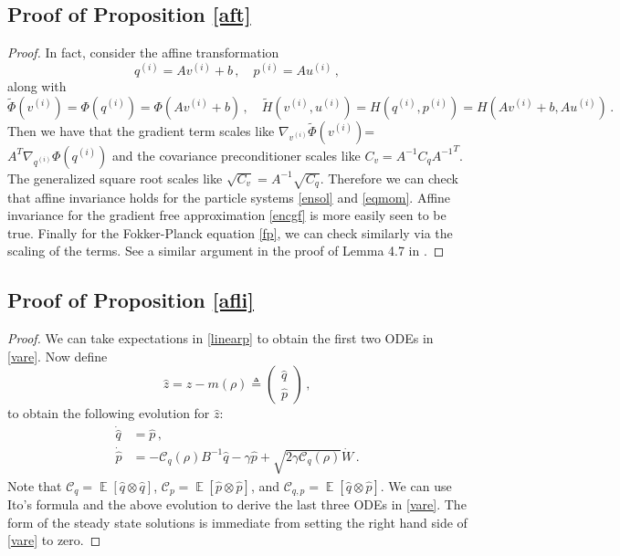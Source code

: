 \documentclass[12pt]{caltech_thesis}
\numberwithin{equation}{section}
\begin{document}
{\subsection{Proof of Proposition \ref{aft}}
\label{proofaf}
\begin{proof}
In fact, consider the affine transformation 
\[q^{(i)}=A v^{(i)}+b\,,\quad p^{(i)}=A u^{(i)}\,,\] along with  $$\tilde{\Phi}(v^{(i)})=\Phi(q^{(i)})=\Phi(Av^{(i)}+b)\,,\quad\tilde{H}(v^{(i)}, u^{(i)})=H(q^{(i)}, p^{(i)})=H(Av^{(i)}+b,Au^{(i)})\,.$$ Then we have that the gradient term scales like $\nabla_{v^{(i)}}\tilde{\Phi}(v^{(i)})$= $A^T\nabla_{q^{(i)}}\Phi(q^{(i)})$ and the covariance preconditioner scales like $C_v={A^{-1}} C_q {A^{-1}}^T$. The generalized square root scales like $\sqrt{C_v}={A^{-1}} \sqrt{C_q}$. Therefore we can check that affine invariance holds for the particle systems \eqref{ensol} and \eqref{eqmom}. Affine invariance for the gradient free approximation  \eqref{encgf} is more easily seen to be true.  Finally for the Fokker-Planck equation \eqref{fp}, we can check similarly via the scaling of the terms. See a similar argument in the proof of Lemma 4.7 in \cite{garbuno2020affine}.
\end{proof}
\subsection{Proof of Proposition \ref{afli}}
\label{proof3.3}
\begin{proof}
{We can take expectations in \eqref{linearp} to obtain the first two ODEs
in \eqref{vare}. Now define $$\hat{z}=z-m(\rho)\triangleq\begin{pmatrix}
\hat{q} \\
\hat{p}
\end{pmatrix}\,,$$  to obtain the following evolution for $\hat{z}$:
\[\begin{aligned}
\dot{\hat{q}}&= \hat{p}\,, \\
\dot{\hat{p}}&=-\mathcal{C}_q(\rho)B^{-1}\hat{q} - {\gamma}\hat{p}+\sqrt{2 {\gamma}\mathcal{C}_q(\rho)}\dot{W}\,.
\end{aligned}\]
Note that $\mathcal{C}_q=\mathop{\mathbb{E}}[\hat{q}\otimes \hat{q}]$, $\mathcal{C}_p=\mathop{\mathbb{E}}[\hat{p}\otimes \hat{p}]$, and $\mathcal{C}_{q,p}=\mathop{\mathbb{E}}[\hat{q}\otimes \hat{p}]$. We can 
use Ito's formula and the above evolution to derive the last three ODEs in \eqref{vare}. 
The form of the steady state solutions is immediate from setting the right hand side of
\eqref{vare} to zero.}


\end{proof}}
\end{document}
